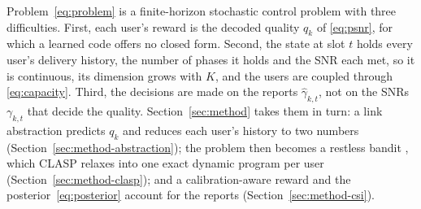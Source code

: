 Problem~\eqref{eq:problem} is a finite-horizon stochastic control problem with three
difficulties. First, each user's reward is the decoded quality $q_k$ of \eqref{eq:psnr}, for
which a learned code offers no closed form. Second, the state at slot $t$ holds every user's
delivery history, the number of phases it holds and the SNR each met, so it is continuous, its
dimension grows with $K$, and the users are coupled through \eqref{eq:capacity}. Third, the
decisions are made on the reports $\hat\gamma_{k,t}$, not on the SNRs $\gamma_{k,t}$ that decide
the quality. Section~\ref{sec:method} takes them in turn: a link abstraction predicts $q_k$ and
reduces each user's history to two numbers (Section~\ref{sec:method-abstraction}); the problem
then becomes a restless bandit \cite{Whittle88}, which CLASP relaxes into one exact dynamic
program per user (Section~\ref{sec:method-clasp}); and a calibration-aware reward and the
posterior~\eqref{eq:posterior} account for the reports (Section~\ref{sec:method-csi}).
